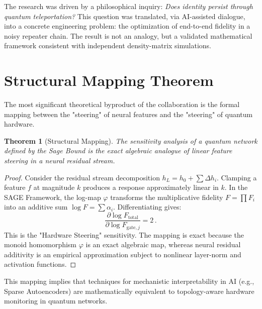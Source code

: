 \documentclass[aps,pra,reprint,amsmath,amssymb,superscriptaddress]{revtex4-2}
\newtheorem{theorem}{Theorem}
\begin{document}
The research was driven by a philosophical inquiry: \emph{Does identity persist through quantum teleportation?} This question was translated, via AI-assisted dialogue, into a concrete engineering problem: the optimization of end-to-end fidelity in a noisy repeater chain. The result is not an analogy, but a validated mathematical framework consistent with independent density-matrix simulations.


\section{Structural Mapping Theorem}

The most significant theoretical byproduct of the collaboration is the formal mapping between the "steering" of neural features and the "steering" of quantum hardware.

\begin{theorem}[Structural Mapping]
The sensitivity analysis of a quantum network defined by the Sage Bound is the exact algebraic analogue of linear feature steering in a neural residual stream.
\end{theorem}

\begin{proof}
Consider the residual stream decomposition $h_L = h_0 + \sum \Delta h_i$. Clamping a feature $f$ at magnitude $k$ produces a response approximately linear in $k$. In the SAGE Framework, the log-map $\varphi$ transforms the multiplicative fidelity $F = \prod F_i$ into an additive sum $\log F = \sum \alpha_i$. Differentiating gives:
\begin{equation}
\frac{\partial \log F_{\text{total}}}{\partial \log F_{\text{gate},j}} = 2 \,.
\end{equation}
This is the "Hardware Steering" sensitivity. The mapping is exact because the monoid homomorphism $\varphi$ is an exact algebraic map, whereas neural residual additivity is an empirical approximation subject to nonlinear layer-norm and activation functions.
\end{proof}

This mapping implies that techniques for mechanistic interpretability in AI (e.g., Sparse Autoencoders) are mathematically equivalent to topology-aware hardware monitoring in quantum networks.

\end{document}
